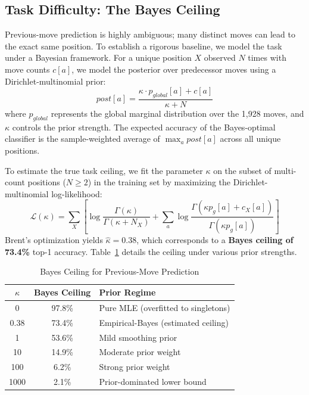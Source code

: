 \documentclass[journal]{IEEEtran}
\begin{document}
\subsection{Task Difficulty: The Bayes Ceiling}
Previous-move prediction is highly ambiguous; many distinct moves can lead to the exact same position. To establish a rigorous baseline, we model the task under a Bayesian framework. For a unique position $X$ observed $N$ times with move counts $c[a]$, we model the posterior over predecessor moves using a Dirichlet-multinomial prior:
\begin{equation}
    post[a] = \frac{\kappa \cdot p_{global}[a] + c[a]}{\kappa + N}
\end{equation}
where $p_{global}$ represents the global marginal distribution over the 1,928 moves, and $\kappa$ controls the prior strength. The expected accuracy of the Bayes-optimal classifier is the sample-weighted average of $\max_a post[a]$ across all unique positions.

To estimate the true task ceiling, we fit the parameter $\kappa$ on the subset of multi-count positions ($N \ge 2$) in the training set by maximizing the Dirichlet-multinomial log-likelihood:
\begin{equation}
    \mathcal{L}(\kappa) = \sum_X \left[ \log \frac{\Gamma(\kappa)}{\Gamma(\kappa + N_X)} + \sum_a \log \frac{\Gamma(\kappa p_g[a] + c_X[a])}{\Gamma(\kappa p_g[a])} \right]
\end{equation}
Brent's optimization yields $\hat{\kappa} = 0.38$, which corresponds to a \textbf{Bayes ceiling of 73.4\%} top-1 accuracy. Table~\ref{tab:bayes_ceiling} details the ceiling under various prior strengths.

\begin{table}[h]
\caption{Bayes Ceiling for Previous-Move Prediction}
\label{tab:bayes_ceiling}
\centering
\begin{tabular}{ccl}
\toprule
$\kappa$ & Bayes Ceiling & Prior Regime \\
\midrule
0 & 97.8\% & Pure MLE (overfitted to singletons) \\
0.38 & 73.4\% & Empirical-Bayes (estimated ceiling) \\
1 & 53.6\% & Mild smoothing prior \\
10 & 14.9\% & Moderate prior weight \\
100 & 6.2\% & Strong prior weight \\
1000 & 2.1\% & Prior-dominated lower bound \\
\bottomrule
\end{tabular}
\end{table}
\end{document}
